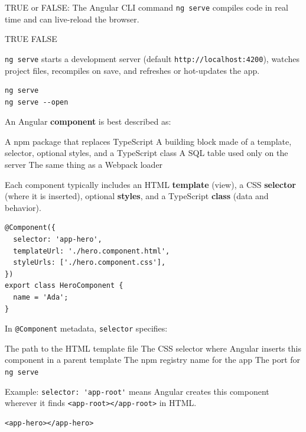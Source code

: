 \question[4]
TRUE or FALSE: The Angular CLI command \lstinline[style=bashinline]|ng serve| compiles code in real time and can live-reload the browser.
\begin{choices}
  \CorrectChoice TRUE
  \choice FALSE
\end{choices}
\begin{solution}
  \lstinline[style=bashinline]|ng serve| starts a development server (default \texttt{http://localhost:4200}), watches project files, recompiles on save, and refreshes or hot-updates the app.
\begin{lstlisting}[style=bash]
ng serve
ng serve --open
\end{lstlisting}
\end{solution}




\question[4]
An Angular \textbf{component} is best described as:
\begin{choices}
  \choice A npm package that replaces TypeScript
  \CorrectChoice A building block made of a template, selector, optional styles, and a TypeScript class
  \choice A SQL table used only on the server
  \choice The same thing as a Webpack loader
\end{choices}
\begin{solution}
  Each component typically includes an HTML \textbf{template} (view), a CSS \textbf{selector} (where it is inserted), optional \textbf{styles}, and a TypeScript \textbf{class} (data and behavior).
\begin{lstlisting}[style=ts]
@Component({
  selector: 'app-hero',
  templateUrl: './hero.component.html',
  styleUrls: ['./hero.component.css'],
})
export class HeroComponent {
  name = 'Ada';
}
\end{lstlisting}
\end{solution}

\question[4]
In \lstinline[style=tsinline]|@Component| metadata, \lstinline[style=tsinline]|selector| specifies:
\begin{choices}
  \choice The path to the HTML template file
  \CorrectChoice The CSS selector where Angular inserts this component in a parent template
  \choice The npm registry name for the app
  \choice The port for \lstinline[style=bashinline]|ng serve|
\end{choices}
\begin{solution}
  Example: \lstinline[style=tsinline]|selector: 'app-root'| means Angular creates this component wherever it finds \lstinline[style=htmlinline]|<app-root></app-root>| in HTML.
\begin{lstlisting}[style=htmlinline]
<app-hero></app-hero>
\end{lstlisting}
\end{solution}


